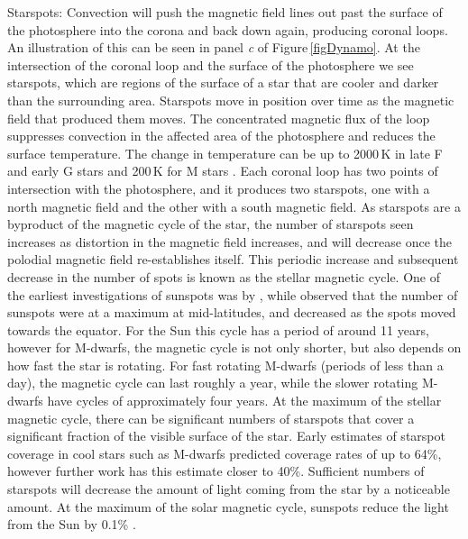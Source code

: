 Starspots: Convection will push the magnetic field lines out past the surface of the photosphere into the corona and back down again, producing coronal loops. An illustration of this can be seen in panel \textit{c} of Figure\,\ref{figDynamo}. At the intersection of the coronal loop and the surface of the photosphere we see starspots, which are regions of the surface of a star that are cooler and darker than the surrounding area. Starspots move in position over time as the magnetic field that produced them moves. The concentrated magnetic flux of the loop suppresses convection in the affected area of the photosphere and reduces the surface temperature. The change in temperature can be up to 2000\,K in late F and early G stars and 200\,K for M stars \citep{2009Strassmeier}. Each coronal loop has two points of intersection with the photosphere, and it produces two starspots, one with a north magnetic field and the other with a south magnetic field. As starspots are a byproduct of the magnetic cycle of the star, the number of starspots seen increases as distortion in the magnetic field increases, and will decrease once the polodial magnetic field re-establishes itself. This periodic increase and subsequent decrease in the number of spots is known as the stellar magnetic cycle. One of the earliest investigations of sunspots was by \citealt{1844Schwabe}, while \citealt{1904Maunder} observed that the number of sunspots were at a maximum at mid-latitudes, and decreased as the spots moved towards the equator. For the Sun this cycle has a period of around 11 years, however for M-dwarfs, the magnetic cycle is not only shorter, but also depends on how fast the star is rotating. For fast rotating M-dwarfs (periods of less than a day), the magnetic cycle can last roughly a year, while the slower rotating M-dwarfs have cycles of approximately four years\citep{2019Kuker}. At the maximum of the stellar magnetic cycle, there can be significant numbers of starspots that cover a significant fraction of the visible surface of the star. Early estimates of starspot coverage in cool stars such as M-dwarfs predicted coverage rates of up to 64\%\citep{1995Neff}, however further work has this estimate closer to 40\%\citep{2004Oneal}. Sufficient numbers of starspots will decrease the amount of light coming from the star by a noticeable amount. At the maximum of the solar magnetic cycle, sunspots reduce the light from the Sun by 0.1\% \citep{2006Carroll}.\\


